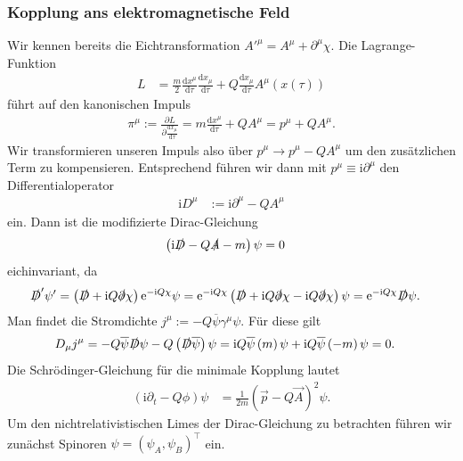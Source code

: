 \documentclass[english, parskip=full]{scrreport}
\newcommand{\kla}{}
\newcommand{\tecxt}{}
\renewcommand{\i}{\text{i}}
\newcommand{\e}{\text{e}}
\begin{document}
\subsubsection{Kopplung ans elektromagnetische Feld}
Wir kennen bereits die Eichtransformation $A'^\mu = A^\mu + \partial^\mu\chi$.
Die Lagrange-Funktion
\begin{align}
L &= \frac{m}{2}\frac{\tecxt\text{d}x^\mu }{\tecxt\text{d}\tau} \frac{\tecxt\text{d}x_\mu }{\tecxt\text{d}\tau} + Q\frac{\tecxt\text{d}x_\mu }{\tecxt\text{d}\tau} A^\mu \kla\left( x(\tau) \right)
\end{align}
führt auf den kanonischen Impuls
\begin{align}
\pi^\mu := \frac{\partial L}{\partial \frac{\tecxt\text{d}x_\mu }{\tecxt\text{d}\tau}} = m\frac{\tecxt\text{d}x^\mu }{\tecxt\text{d}\tau} + Q A^\mu = p^\mu + QA^\mu.
\end{align}
Wir transformieren unseren Impuls also über $p^\mu \rightarrow p^\mu - QA^\mu$ um den zusätzlichen Term zu kompensieren.
Entsprechend führen wir dann mit $p^\mu \equiv \i\partial^\mu$ den Differentialoperator
\begin{align}
\i D^\mu &:= \i\partial^\mu - QA^\mu 
\end{align}
ein.
Dann ist die modifizierte Dirac-Gleichung
\begin{align}
\kla\left( \i \slashed{D} - Q\slashed{A} - m \right)\psi &= 0
\end{align}
eichinvariant, da 
\begin{align}
\slashed{D}'\psi' &= \kla\left( \slashed{D} + \i Q\slashed{\partial}\chi \right) \e^{-\i Q\chi}\psi = \e^{-\i Q\chi} \kla\left( \slashed{D} + \i Q\slashed{\partial}\chi - \i Q\slashed{\partial}\chi \right)\psi = \e^{-\i Q\chi}\slashed{D}\psi.
\end{align}
Man findet die Stromdichte $j^\mu := -Q\overline{\psi}\gamma^\mu \psi$.
Für diese gilt
\begin{align}
D_\mu j^\mu &= -Q\overline{\psi}\slashed{D}\psi - Q\kla\left( \slashed{D}\overline{\psi} \right)\psi = \i Q\overline{\psi}\kla\left( m \right)\psi + \i Q\overline{\psi}\kla\left( -m  \right)\psi =  0.
\end{align}
Die Schrödinger-Gleichung für die minimale Kopplung lautet
\begin{align}
\kla\left( \i\partial_t - Q\phi \right)\psi &= \frac{1}{2m} \kla\left( \vec{p} - Q\vec{A} \right)^2\psi.
\end{align}
Um den nichtrelativistischen Limes der Dirac-Gleichung zu betrachten führen wir zunächst Spinoren $\psi = (\psi_A, \psi_B)^\top$ ein.
\end{document}
